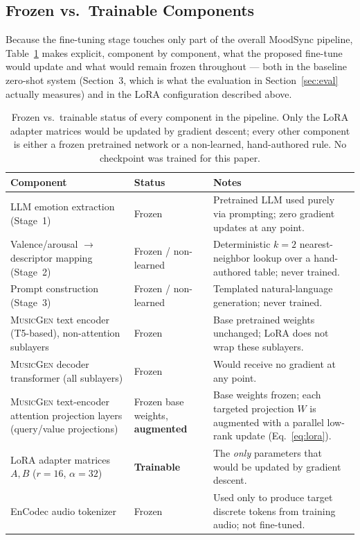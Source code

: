 \documentclass[11pt]{article}
\newcommand{\musicgen}{\textsc{MusicGen}}
\begin{document}
\subsection{Frozen vs.\ Trainable Components}
\label{sec:frozen}

Because the fine-tuning stage touches only part of the overall MoodSync pipeline, Table~\ref{tab:frozen} makes explicit, component by component, what the proposed fine-tune would update and what would remain frozen throughout --- both in the baseline zero-shot system (Section~3, which is what the evaluation in Section~\ref{sec:eval} actually measures) and in the LoRA configuration described above.

\begin{table}[t]
\centering
\caption{Frozen vs.\ trainable status of every component in the pipeline. Only the LoRA adapter matrices would be updated by gradient descent; every other component is either a frozen pretrained network or a non-learned, hand-authored rule. No checkpoint was trained for this paper.}
\label{tab:frozen}
\small
\begin{tabular}{@{}p{4.6cm}p{2.1cm}p{6.3cm}@{}}
\toprule
Component & Status & Notes \\
\midrule
LLM emotion extraction (Stage~1) & Frozen & Pretrained LLM used purely via prompting; zero gradient updates at any point. \\
Valence/arousal $\to$ descriptor mapping (Stage~2) & Frozen / non-learned & Deterministic $k{=}2$ nearest-neighbor lookup over a hand-authored table; never trained. \\
Prompt construction (Stage~3) & Frozen / non-learned & Templated natural-language generation; never trained. \\
\musicgen{} text encoder (T5-based), non-attention sublayers & Frozen & Base pretrained weights unchanged; LoRA does not wrap these sublayers. \\
\musicgen{} decoder transformer (all sublayers) & Frozen & Would receive no gradient at any point. \\
\musicgen{} text-encoder attention projection layers (query/value projections) & Frozen base weights, \textbf{augmented} & Base weights frozen; each targeted projection $W$ is augmented with a parallel low-rank update (Eq.~\ref{eq:lora}). \\
LoRA adapter matrices $A, B$ ($r=16$, $\alpha=32$) & \textbf{Trainable} & The \emph{only} parameters that would be updated by gradient descent. \\
EnCodec audio tokenizer & Frozen & Used only to produce target discrete tokens from training audio; not fine-tuned. \\
\bottomrule
\end{tabular}
\end{table}
\end{document}
